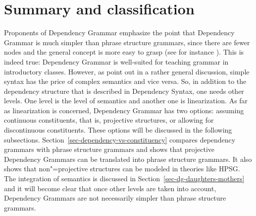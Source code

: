 



\section{Summary and classification}




Proponents of Dependency Grammar emphasize the point that Dependency Grammar is much simpler than
phrase structure grammars, since there are fewer nodes and the general concept is more easy to
grasp (see for instance \citealp[Section~3.2, Section~7]{Osborne2014a-u}). This is indeed true: Dependency Grammar is well-suited for teaching grammar in
introductory classes. However, as \citet[]{SR2012a} point out in a rather general
discussion, simple syntax has the price of complex semantics and vice versa. So, in addition to
the dependency structure that is described in Dependency Syntax, one needs other levels. One level
is the level of semantics and another one is linearization. As far as linearization is concerned,
Dependency Grammar has two options: assuming continuous constituents, that is, projective structures,
or allowing for discontinuous constituents. These options will be discussed in the following subsections.
Section~\ref{sec-dependency-vs-constituency} compares dependency grammars with phrase structure
grammars and shows that projective Dependency Grammars can be translated into phrase structure
grammars. It also shows that non"=projective structures can be modeled in theories like HPSG.
The integration of semantics is discussed in Section~\ref{sec-dg-daughters-mothers} and it will become clear that once other
levels are taken into account, Dependency Grammars are not necessarily simpler than phrase structure grammars.


